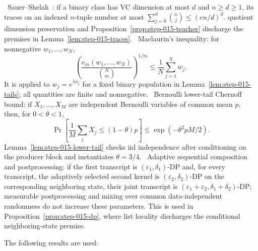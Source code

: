 \noindent\textbullet\ Sauer--Shelah~\citep{sauer1972}: if a binary class has VC dimension at most \(d\) and
  \(n\ge d\ge1\), its traces on an indexed \(n\)-tuple number at most
  \(\sum_{j=0}^d\binom nj\le(en/d)^d\).  quotient dimension
  preservation and Proposition~\ref{prop:step-015-teacher} discharge the
  premises in Lemma~\ref{lem:step-015-traces}.
\noindent\textbullet\ Maclaurin's inequality: for nonnegative \(w_1,\ldots,w_N\),
  \[
  \left(\frac{e_m(w_1,\ldots,w_N)}{\binom Nm}\right)^{1/m}
  \le\frac1N\sum_{j=1}^Nw_j.
  \tag{C6}
  \]
  It is applied to \(w_j=e^{\lambda x_j}\) for a fixed binary population in
  Lemma~\ref{lem:step-015-tails}; all quantities are finite and
  nonnegative.
\noindent\textbullet\ Bernoulli lower-tail Chernoff bound: if \(X_1,\ldots,X_M\) are
  independent Bernoulli variables of common mean \(p\), then, for
  \(0<\theta<1\),
  \[
  \Pr\!\left[\frac1M\sum_jX_j\le(1-\theta)p\right]
  \le\exp(-\theta^2pM/2).
  \tag{C7}
  \]
  Lemma~\ref{lem:step-015-lower-tail} checks iid independence after
  conditioning on the producer block and instantiates
  \(\theta=3/4\).
\noindent\textbullet\ Adaptive sequential composition and postprocessing: if the first
  transcript is \((\varepsilon_1,\delta_1)\)-DP and, for every transcript,
  the adaptively selected second kernel is
  \((\varepsilon_2,\delta_2)\)-DP on the corresponding neighboring state,
  their joint transcript is
  \((\varepsilon_1+\varepsilon_2,\delta_1+\delta_2)\)-DP; measurable
  postprocessing and mixing over common data-independent randomness do not
  increase these parameters. This is used in
  Proposition~\ref{prop:step-015-dp}, where list locality discharges the
  conditional neighboring-state premise.

The following results are used:


